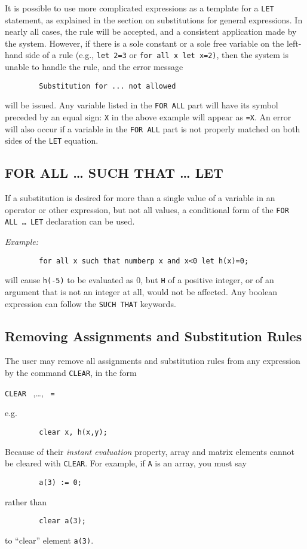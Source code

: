 It is possible to use more complicated expressions as a template for a
\texttt{LET} statement, as explained in the section on substitutions for
general expressions.  In nearly all cases, the rule will be accepted, and
a consistent application made by the system.  However, if there is a sole
constant or a sole free variable on the left-hand side of a rule (e.g.,
\texttt{let 2=3} or \texttt{for all x let x=2)}, then the system is unable to
handle the rule, and the error message
\begin{verbatim}
        Substitution for ... not allowed
\end{verbatim}
will be issued.  Any variable listed in the \texttt{FOR ALL} part will have
its symbol preceded by an equal sign: \texttt{X} in the above example will
appear as \texttt{=X}.  An error will also occur if a variable in the
\texttt{FOR ALL} part is not properly matched on both sides of the \texttt{LET}
equation.

\subsection{FOR ALL \ldots{} SUCH THAT \ldots{} LET}
\hypertarget{command:SUCHTHAT}{}

If a substitution is desired for more than a single value of a variable in
an operator or other expression, but not all values, a conditional form of
the \texttt{FOR ALL \ldots{} LET} declaration can be used.

\textit{Example:}
\begin{verbatim}
        for all x such that numberp x and x<0 let h(x)=0;
\end{verbatim}
will cause \texttt{h(-5)} to be evaluated as 0, but \texttt{H} of a positive
integer, or of an argument that is not an integer at all, would not be
affected.  Any boolean expression can follow the \texttt{SUCH THAT} keywords.

\hypertarget{reserved:CLEAR}{\subsection{Removing Assignments and Substitution Rules}}

The user may remove all assignments and substitution rules from any
expression by the command \texttt{CLEAR}, in the form
\begin{syntax}
  \texttt{CLEAR } ,\dots, \texttt{ = } 
\end{syntax}
e.g.
\begin{verbatim}
        clear x, h(x,y);
\end{verbatim}
Because of their \emph{instant evaluation} property, array and matrix elements
cannot be cleared with \texttt{CLEAR}.  For example, if \texttt{A} is an array,
you must say
\begin{verbatim}
        a(3) := 0;
\end{verbatim}
rather than
\begin{verbatim}
        clear a(3);
\end{verbatim}
to ``clear'' element \texttt{a(3)}.


